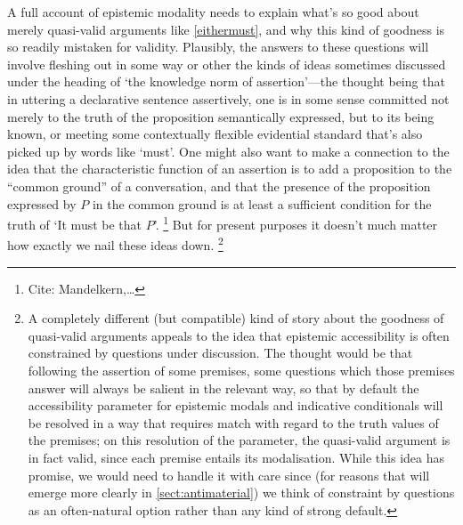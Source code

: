 \documentclass[If.tex]{subfiles}
\begin{document}
A full account of epistemic modality needs to explain what's so good about merely quasi-valid arguments like \ref{eithermust}, and why this kind of goodness is so readily mistaken for validity.  Plausibly, the answers to these questions will involve fleshing out in some way or other the kinds of ideas sometimes discussed under the heading of ‘the knowledge norm of assertion’---the thought being that in uttering a declarative sentence assertively, one is in some sense committed not merely to the truth of the proposition semantically expressed, but to its being known, or meeting some contextually flexible evidential standard that's also picked up by words like ‘must’.  One might also want to make a connection to the idea \citep{StalnakerAssertion} that the characteristic function of an assertion is to add a proposition to the “common ground” of a conversation, and that the presence of the proposition expressed by $P$ in the common ground is at least a sufficient condition for the truth of ‘It must be that $P$’.%
\footnote{Cite: Mandelkern,…}  
But for present purposes it doesn't much matter how exactly we nail these ideas down.%
\footnote{A completely different (but compatible) kind of story about the goodness of quasi-valid arguments appeals to the idea that epistemic accessibility is often constrained by questions under discussion.  The thought would be that following the assertion of some premises, some questions which those premises answer will always be salient in the relevant way, so that by default the accessibility parameter for epistemic modals and indicative conditionals will be resolved in a way that requires match with regard to the truth values of the premises; on this resolution of the parameter, the quasi-valid argument is in fact valid, since each premise entails its modalisation.  While this idea has promise, we would need to handle it with care since (for reasons that will emerge more clearly in \autoref{sect:antimaterial}) we think of constraint by questions as an often-natural option rather than any kind of strong default.}
\end{document}
